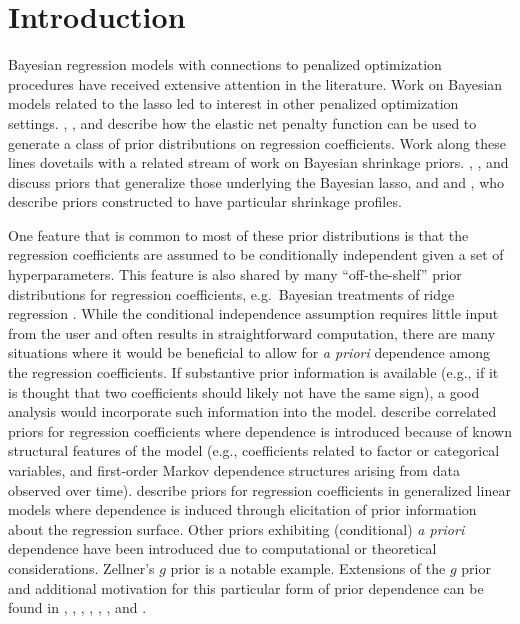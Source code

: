 \documentclass[12pt]{article}
\begin{document}
\section{Introduction}\label{sec:intro}
Bayesian regression models with connections to penalized optimization procedures
have received extensive attention in the literature.
Work on Bayesian models  \citep{park:08, hans:09, hans:10} related to the lasso 
\citep{tibs:96} led  to interest in other penalized optimization settings.  
\citet{li:10}, \citet{hans:11}, and \citet{roy:17} describe how the elastic net penalty 
function \citep{zou:05} can be used to generate a class of prior distributions on regression 
coefficients. Work along these lines dovetails with a related stream of work on Bayesian shrinkage 
priors. \citet{grif:10, grif:11}, \citet{arma:13}, and \citet{bhat:15} discuss priors that generalize those 
underlying the Bayesian lasso, and \citet{carv:10} and \citet{pols:11, pols:12, pols:12b}, who describe 
priors constructed to have particular shrinkage profiles.

One feature that is common to most of these prior distributions is that the regression 
coefficients are assumed to be conditionally independent given a set of hyperparameters. This feature
is also shared by many ``off-the-shelf'' prior distributions for regression coefficients,
e.g.~Bayesian treatments of ridge regression \citep{hoer:70}. 
While the conditional independence assumption requires little input from the user and
often results in straightforward computation, there are many situations where it
would be beneficial to allow for \emph{a priori} dependence among the 
regression coefficients.  If substantive prior information is available
(e.g., if it is thought that two coefficients should likely not have the same sign), a
good analysis would incorporate such information into the model.  \citet{grif:12}
describe correlated priors for regression coefficients where dependence is
introduced because of known structural features of the model (e.g., coefficients
related to factor or categorical variables, and first-order Markov dependence structures 
arising from data observed over time).  \citet{bedr:96} describe priors for regression
coefficients in generalized linear models where dependence is induced through elicitation
of prior information about the regression surface.  Other priors exhibiting (conditional)
\emph{a priori} dependence have been introduced due to computational or theoretical
considerations.  Zellner's $g$ prior \citep{zell:86} is a notable example.  Extensions of
the $g$ prior and additional motivation for this particular form of prior dependence can
be found in \cite{zell:80}, \citet{west:03}, \citet{cui:08}, \citet{lian:08}, \citet{maru:11}, 
\citet{baya:12}, \citet{maru:14} and \citet{som:14}.
\end{document}
